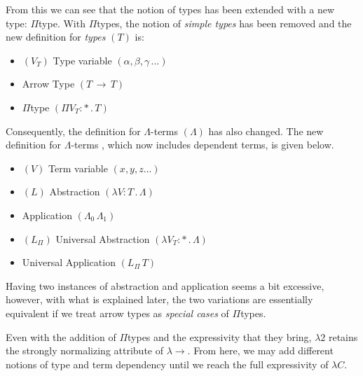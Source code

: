\documentclass[9pt,preprint,nocopyrightspace,computermodern]{sigplanconf} %
\begin{document}
From this we can see that the notion of types has been extended with a new type:
\(\Pi\)type. With \(\Pi\)types, the notion of \textit{simple types} has been removed
and the new definition for \textit{types} \((T)\) is:
\begin{itemize}
\item \((V_T)\) Type variable \((\alpha,\beta,\gamma\,...)\)
\item Arrow Type \((T\,\rightarrow\,T)\)
\item \(\Pi\)type \((\Pi V_T:*\,.\,T)\)
\end{itemize}
Consequently, the definition for \(\Lambda\)-terms \((\Lambda)\) has also changed.
The new definition for \(\Lambda\)-terms \cite{gir2}, which now includes dependent
terms, is given below.
\begin{itemize}
\item \((V)\) Term variable \((x,y,z...)\)
\item \((L)\) Abstraction \((\lambda V:T\,.\,\Lambda)\)
\item Application \((\Lambda_0\,\Lambda_1)\)
\item \((L_\Pi)\) Universal Abstraction \((\lambda V_T:*\,.\,\Lambda)\)
\item Universal Application \((L_\Pi\,T)\)
\end{itemize}
Having two instances of abstraction and application seems a bit excessive, however,
with what is explained later, the two variations are essentially equivalent if
we treat arrow types as \textit{special cases} of \(\Pi\)types.

Even with the addition of \(\Pi\)types and the expressivity that they bring,
\(\lambda2\) retains the strongly normalizing attribute of \(\lambda\!\!\!\rightarrow\).
From here, we may add different notions of type and term dependency until we reach
the full expressivity of \(\lambda C\).


\end{document}
